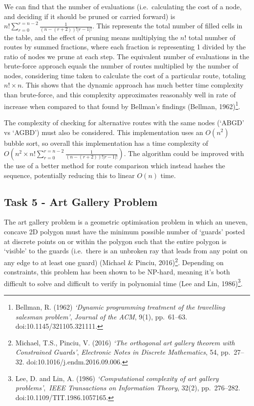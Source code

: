 \documentclass[
]{article}
\begin{document}
We can find that the number of evaluations (i.e.~calculating the cost of
a node, and deciding if it should be pruned or carried forward) is
\(n!\sum_{r=0}^{r=n-2} \frac{1}{(n-(r+2))!|r-1|!}\). This represents the
total number of filled cells in the table, and the effect of pruning
means multiplying the \(n!\) total number of routes by summed fractions,
where each fraction is representing 1 divided by the ratio of nodes we
prune at each step. The equivalent number of evaluations in the
brute-force approach equals the number of routes multiplied by the
number of nodes, considering time taken to calculate the cost of a
particular route, totaling \(n!\times n\). This shows that the dynamic
approach has much better time complexity than brute-force, and this
complexity approximates reasonably well in rate of increase when
compared to that found by Bellman's findings (Bellman, 1962)\footnote{Bellman,
  R. (1962) \emph{`Dynamic programming treatment of the travelling
  salesman problem'}, \emph{Journal of the ACM}, 9(1), pp.~61--63.
  doi:10.1145/321105.321111.}.

The complexity of checking for alternative routes with the same nodes
(`ABGD' vs `AGBD') must also be considered. This implementation uses an
\(O(n^2)\) bubble sort, so overall this implementation has a time
complexity of
\(O(n^2\times n!\sum_{r=0}^{r=n-2} \frac{1}{(n-(r+2))!|r-1|!})\). The
algorithm could be improved with the use of a better method for route
comparison which instead hashes the sequence, potentially reducing this
to linear \(O(n)\) time.

\newpage

\subsection{Task 5 - Art Gallery
Problem}\label{task-5---art-gallery-problem}

The art gallery problem is a geometric optimisation problem in which an
uneven, concave 2D polygon must have the minimum possible number of
`guards' posted at discrete points on or within the polygon such that
the entire polygon is `visible' to the guards (i.e.~there is an unbroken
ray that leads from any point on any edge to at least one guard)
(Michael \& Pinciu, 2016)\footnote{Michael, T.S., Pinciu, V. (2016)
  \emph{`The orthogonal art gallery theorem with Constrained Guards'},
  \emph{Electronic Notes in Discrete Mathematics}, 54, pp.~27--32.
  doi:10.1016/j.endm.2016.09.006.}. Depending on constraints, this
problem has been shown to be NP-hard, meaning it's both difficult to
solve and difficult to verify in polynomial time (Lee and Lin,
1986)\footnote{Lee, D. and Lin, A. (1986) \emph{`Computational
  complexity of art gallery problems'},~\emph{IEEE Transactions on
  Information Theory}, 32(2), pp.~276--282.
  doi:10.1109/TIT.1986.1057165.}.
\end{document}
